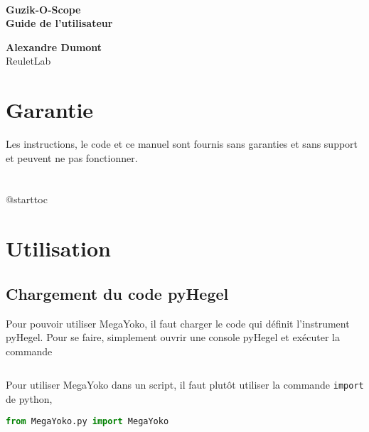 \documentclass[openright,letterpaper,12pt]{book}
\begin{document}

\clearpage\null\thispagestyle{empty}\clearpage
\thispagestyle{empty}
{\ } 

\vspace{3cm}
\noindent
{\fontsize{35.83pt}{40pt}\selectfont\bf Guzik-O-Scope\\} 
{\Large\bf Guide de l'utilisateur}

\vspace{10cm}\noindent
{\huge\bf Alexandre Dumont}\\
{\large ReuletLab}

\clearpage\null\thispagestyle{empty}

\renewcommand{\tableofcontents}
             {
                \clearpage
                \chapter*{\pdfbookmark[chapter]{\contentsname}{toc}
                          \contentsname}
                \csname @starttoc\endcsname{toc}
             }
\frontmatter
\chapter*{Garantie}
Les instructions, le code et ce manuel sont fournis sans garanties et sans 
support et peuvent ne pas fonctionner.
\clearpage\null\thispagestyle{empty}

\tableofcontents
\clearpage\null\thispagestyle{empty}

\mainmatter

\clearpage
\chapter*{Utilisation}

\section*{Chargement du code pyHegel}
Pour pouvoir utiliser MegaYoko, il faut charger le code qui définit 
l'instrument pyHegel. 
Pour se faire, simplement ouvrir une console pyHegel et exécuter la commande
\begin{lstlisting}[]
%run -i MegaYoko.py
\end{lstlisting}
Pour utiliser MegaYoko dans un script, il faut plutôt utiliser la commande 
\verb+import+ de python,
\begin{lstlisting}[language=Python]
from MegaYoko.py import MegaYoko
\end{lstlisting}
\end{document}
